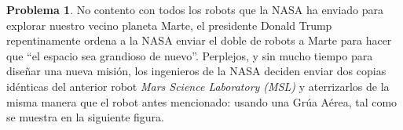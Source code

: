 \documentclass[ a4paper, twoside, 11pt]{article}
\theoremstyle{definition}
\newtheorem{problem}[definition]{Problema}
\begin{document}
\begin{problem}
No contento con todos los robots que la NASA ha enviado para explorar nuestro vecino planeta Marte, el presidente Donald Trump repentinamente ordena a la NASA enviar el doble de robots a Marte para hacer que ``el espacio sea grandioso de nuevo''. \linebreak Perplejos, y sin mucho tiempo para dise\~nar una nueva misi\'on, los ingenieros de la NASA deciden enviar dos copias id\'enticas del anterior robot \emph{Mars Science Laboratory (MSL)} y aterrizarlos de la misma manera que el robot antes mencionado: usando una Gr\'ua A\'erea, tal como se muestra en la siguiente figura. 

\begin{figure}[htb]
\centering
\def\svgwidth{0.6\columnwidth}

\label{fig:prob_poleas}
\caption{}
\end{figure}


\end{problem}
\end{document}
